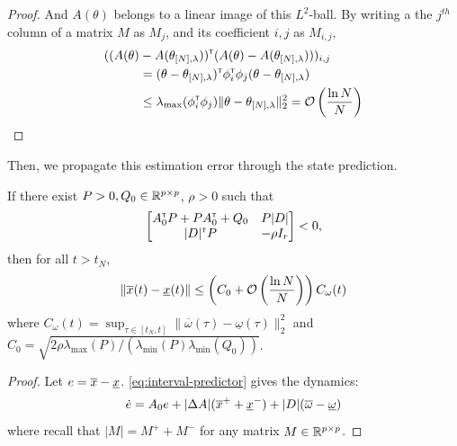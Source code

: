 \begin{subappendices}
\begin{proof}
		And $A(\theta)$ belongs to a linear image of this $L^2$-ball. By writing a the $j^{th}$ column of a matrix $M$ as $M_j$, and its coefficient $i,j$ as $M_{i,j}$,
		\begin{align*}
		((A(\theta)&-A(\theta_{[N],\lambda}))^{\mathsf{\scriptscriptstyle T}} (A(\theta) - A(\theta_{[N],\lambda})))_{i,j}\\
		&= (\theta-\theta_{[N],\lambda})^{\mathsf{\scriptscriptstyle T}}\phi_{i}^{\mathsf{\scriptscriptstyle T}}\phi_j(\theta-\theta_{[N],\lambda}) \\
		&\leq \lambda_{\max}(\phi_{i}^{\mathsf{\scriptscriptstyle T}}\phi_j) \|\theta - \theta_{[N],\lambda}\|_{2}^2 = \mathcal{O}\left( {\frac{\ln N}{N}} \right) 
		\end{align*}
		
	\end{proof}
	
	Then, we propagate this estimation error through the state prediction.
	
	\begin{lemma}
		If there exist $P>0,Q_0\in\mathbb{R}^{p\times p}$, $\rho>0$ such that
		\begin{align*}
		\begin{bmatrix}
		A_0^{\mathsf{\scriptscriptstyle T}} P + P A_0^{\mathsf{\scriptscriptstyle T}} + Q_0 & P|D|  \\
		|D|^{\mathsf{\scriptscriptstyle T}} P & -\rho I_r \\
		\end{bmatrix}< 0,
		\end{align*}
		then for all $t> t_N$,
		\[\|\overline{x}(t) - \underline{x}(t)\| \leq \left(C_0 + \mathcal{O}\left({\frac{\ln N}{N}} \right)\right)C_\omega(t) \]
		where $C_\omega(t) = \sup_{\tau\in[t_N,t]} \|\overline{\omega}(\tau) - \underline{\omega}(\tau)\|_2^2$ and $C_0 = \sqrt{{2\rho\lambda_{\max}(P)}/({\lambda_{\min}(P)\lambda_{\min}(Q_0)})}$.
	\end{lemma}
	\begin{proof}
		Let $e = \overline{x} - \underline{x}$. \eqref{eq:interval-predictor} gives the dynamics:
		\begin{align*}
		\dot{e} = A_0e + |\Delta A|(\overline{x}^+ + \underline{x}^-) + |D|(\overline{\omega} - \underline{\omega})
		\end{align*}
		where recall that $|M| = M^+ + M^-$ for any matrix $M\in\mathbb{R}^{p\times p}$.
		

\end{proof}
\end{subappendices}
